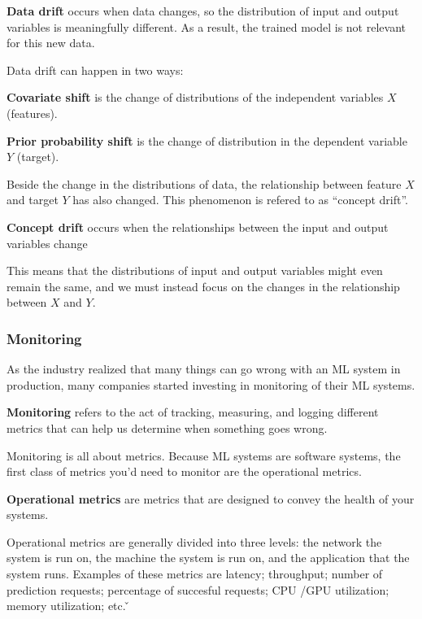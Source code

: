 \textbf{Data drift} occurs when data changes, so the distribution of input and output variables is meaningfully
different. As a result, the trained model is not relevant for this new data.
\ed

Data drift can happen in two ways:

\textbf{Covariate shift} is the change of distributions of the independent variables $X$ (features).
\ed

\textbf{Prior probability shift} is the change of distribution in the dependent variable $Y$ (target).
\ed

Beside the change in the distributions of data, the relationship between feature $X$ and target $Y$ has also changed.
This phenomenon is refered to as ``concept drift''.

\textbf{Concept drift} occurs when the relationships between the input and output variables change
\ed

This means that the distributions of input and output variables might even remain the same, and we must instead focus
on the changes in the relationship between $X$ and $Y$.

\subsubsection{Monitoring}

As the industry realized that many things can go wrong with an ML system in production, many companies started
investing in monitoring of their ML systems.

\bd[Monitoring]
\textbf{Monitoring} refers to the act of tracking, measuring, and logging different metrics that can help us determine
when something goes wrong.
\ed

Monitoring is all about metrics. Because ML systems are software systems, the first class of metrics you'd need to
monitor are the operational metrics.

\textbf{Operational metrics} are metrics that are designed to convey the health of your systems.
\ed

Operational metrics are generally divided into three levels: the network the system is run on, the machine the system
is run on, and the application that the system runs. Examples of these metrics are latency; throughput; number of
prediction requests; percentage of succesful requests; CPU /GPU utilization; memory utilization; etc. \v

